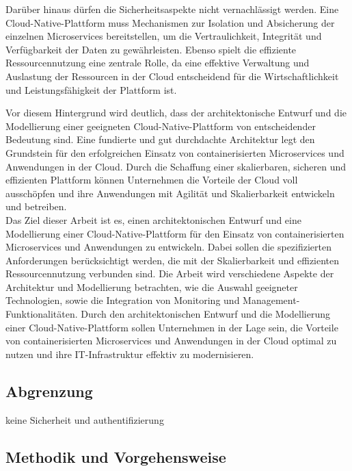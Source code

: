 Darüber hinaus dürfen die Sicherheitsaspekte nicht vernachlässigt werden. Eine Cloud-Native-Plattform muss Mechanismen zur Isolation und Absicherung der einzelnen Microservices bereitstellen, um die Vertraulichkeit, Integrität und Verfügbarkeit der Daten zu gewährleisten. Ebenso spielt die effiziente Ressourcennutzung eine zentrale Rolle, da eine effektive Verwaltung und Auslastung der Ressourcen in der Cloud entscheidend für die Wirtschaftlichkeit und Leistungsfähigkeit der Plattform ist.

Vor diesem Hintergrund wird deutlich, dass der architektonische Entwurf und die Modellierung einer geeigneten Cloud-Native-Plattform von entscheidender Bedeutung sind. Eine fundierte und gut durchdachte Architektur legt den Grundstein für den erfolgreichen Einsatz von containerisierten Microservices und Anwendungen in der Cloud. Durch die Schaffung einer skalierbaren, sicheren und effizienten Plattform können Unternehmen die Vorteile der Cloud voll ausschöpfen und ihre Anwendungen mit Agilität und Skalierbarkeit entwickeln und betreiben.
\\
Das Ziel dieser Arbeit ist es, einen architektonischen Entwurf und eine Modellierung einer Cloud-Native-Plattform für den Einsatz von containerisierten Microservices und Anwendungen zu entwickeln. Dabei sollen die spezifizierten Anforderungen berücksichtigt werden, die mit der Skalierbarkeit und effizienten Ressourcennutzung verbunden sind. Die Arbeit wird verschiedene Aspekte der Architektur und Modellierung betrachten, wie die Auswahl geeigneter Technologien, sowie die Integration von Monitoring und Management-Funktionalitäten. Durch den architektonischen Entwurf und die Modellierung einer Cloud-Native-Plattform sollen Unternehmen in der Lage sein, die Vorteile von containerisierten Microservices und Anwendungen in der Cloud optimal zu nutzen und ihre IT-Infrastruktur effektiv zu modernisieren.
\subsection{Abgrenzung}
keine Sicherheit und authentifizierung
\subsection{Methodik und Vorgehensweise}